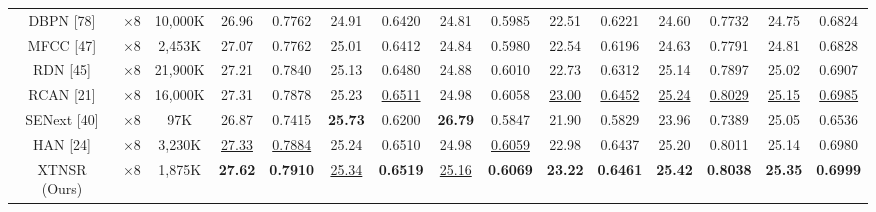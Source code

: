 \documentclass[twocolumn]{svjour3}          %
\begin{document}
\begin{table}
\begin{tabular}{|c|c|c|cc|cc|cc|cc|cc|cc|}
DBPN [78]& $\times8$&10,000K& \multicolumn{1}{c|}{26.96} &  0.7762 & \multicolumn{1}{c|}{24.91} & 0.6420&\multicolumn{1}{c|}{24.81} & 0.5985 & \multicolumn{1}{c|}{22.51  } &0.6221 & \multicolumn{1}{c|}{24.60 } &0.7732
&\multicolumn{1}{c|}{24.75  } &  0.6824       \\

MFCC [47]& $\times8$&2,453K& \multicolumn{1}{c|}{27.07} &  0.7762 & \multicolumn{1}{c|}{25.01} & 0.6412&\multicolumn{1}{c|}{24.84} & 0.5980 & \multicolumn{1}{c|}{22.54  } &0.6196 & \multicolumn{1}{c|}{24.63 } &0.7791 &\multicolumn{1}{c|}{24.81  } &  0.6828       \\

RDN [45]& $\times8$&21,900K& \multicolumn{1}{c|}{27.21} &  0.7840 & \multicolumn{1}{c|}{25.13} & 0.6480&\multicolumn{1}{c|}{24.88} & 0.6010 & \multicolumn{1}{c|}{22.73  } &0.6312 & \multicolumn{1}{c|}{25.14 } &0.7897 &\multicolumn{1}{c|}{25.02  } &  0.6907       \\

RCAN [21]& $\times8$&16,000K& \multicolumn{1}{c|}{27.31} &  0.7878 & \multicolumn{1}{c|}{25.23} & {\color{blue}\underline{0.6511}}&\multicolumn{1}{c|}{24.98} & 0.6058 & \multicolumn{1}{c|}{\color{blue}\underline{23.00}} &{\color{blue}\underline{0.6452}} & \multicolumn{1}{c|}{\color{blue}\underline{25.24 }} &{\color{blue}\underline{0.8029}}
&\multicolumn{1}{c|}{\color{blue}\underline{25.15}} &  {\color{blue}\underline{0.6985}}       \\

SENext [40] & $\times8$ &97K& \multicolumn{1}{c|}{26.87} &{0.7415} & \multicolumn{1}{c|}{\color{red}\textbf{25.73}} &{0.6200} & \multicolumn{1}{c|}{\color{red}\textbf{26.79}} &{0.5847} & \multicolumn{1}{c|}{21.90} &{0.5829} & \multicolumn{1}{c|}{23.96} &{0.7389} &\multicolumn{1}{c|}{25.05} &{0.6536}  \\


HAN [24] & $\times8$&3,230K& \multicolumn{1}{c|}{\color{blue}\underline{27.33}} &{\color{blue}\underline{0.7884}}   & \multicolumn{1}{c|}{25.24} & 0.6510   &\multicolumn{1}{c|}{24.98} &{\color{blue}\underline{0.6059}}   & \multicolumn{1}{c|}{22.98} &{0.6437} & \multicolumn{1}{c|}{25.20}  &{0.8011} &\multicolumn{1}{c|}{25.14} &{0.6980} \\

XTNSR (Ours) & $\times8$ &1,875K& \multicolumn{1}{c|}{\color{red}\textbf{27.62}} &{\color{red}\textbf{0.7910}} & \multicolumn{1}{c|}{\color{blue}\underline{25.34}} &{\color{red}\textbf{0.6519}} & \multicolumn{1}{c|}{\color{blue}\underline{25.16}} &{\color{red}\textbf{0.6069}} & \multicolumn{1}{c|}{\color{red}\textbf{23.22}} &{\color{red}\textbf{0.6461}} & \multicolumn{1}{c|}{\color{red}\textbf{25.42}} &{\color{red}\textbf{0.8038}} &\multicolumn{1}{c|}{\color{red}\textbf{25.35}} &{\color{red}\textbf{0.6999}}  \\

\hline

\end{tabular}
\end{table}
\end{document}
